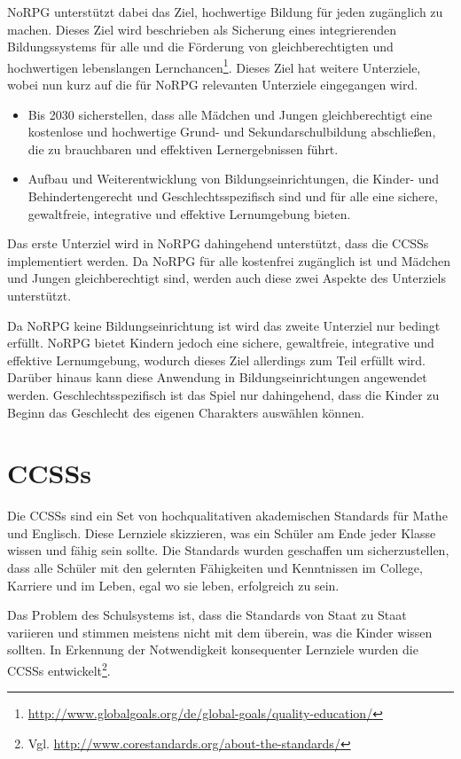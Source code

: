 NoRPG unterstützt dabei das Ziel, hochwertige Bildung für jeden zugänglich zu machen. Dieses Ziel wird beschrieben als Sicherung eines integrierenden Bildungssystems für alle und die Förderung von gleichberechtigten und hochwertigen lebenslangen Lernchancen\footnote{\url{http://www.globalgoals.org/de/global-goals/quality-education/}}. Dieses Ziel hat weitere Unterziele, wobei nun kurz auf die für NoRPG relevanten Unterziele eingegangen wird.

\begin{itemize}
\item Bis 2030 sicherstellen, dass alle Mädchen und Jungen gleichberechtigt eine kostenlose und hochwertige Grund- und Sekundarschulbildung abschließen, die zu brauchbaren und effektiven Lernergebnissen führt.

\item Aufbau und Weiterentwicklung von Bildungseinrichtungen, die Kinder- und Behindertengerecht und Geschlechtsspezifisch sind und für alle eine sichere, gewaltfreie, integrative und effektive Lernumgebung bieten.
\end{itemize}

Das erste Unterziel wird in NoRPG dahingehend unterstützt, dass die \acfp{CCSS} implementiert werden. Da NoRPG für alle kostenfrei zugänglich ist und Mädchen und Jungen gleichberechtigt sind, werden auch diese zwei Aspekte des Unterziels unterstützt. 

Da NoRPG keine Bildungseinrichtung ist wird das zweite Unterziel nur bedingt erfüllt. NoRPG bietet Kindern jedoch eine sichere, gewaltfreie, integrative und effektive Lernumgebung, wodurch dieses Ziel allerdings zum Teil erfüllt wird. Darüber hinaus kann diese Anwendung in Bildungseinrichtungen angewendet werden. Geschlechtsspezifisch ist das Spiel nur dahingehend, dass die Kinder zu Beginn das Geschlecht des eigenen Charakters auswählen können.

\section{\aclp{CCSS}}
Die \acp{CCSS} sind ein Set von hochqualitativen akademischen Standards für Mathe und Englisch. Diese Lernziele skizzieren, was ein Schüler am Ende jeder Klasse wissen und fähig sein sollte. Die Standards wurden geschaffen um sicherzustellen, dass alle Schüler mit den gelernten Fähigkeiten und Kenntnissen im College, Karriere und im Leben, egal wo sie leben, erfolgreich zu sein.

Das Problem des Schulsystems ist, dass die Standards von Staat zu Staat variieren und stimmen meistens nicht mit dem überein, was die Kinder wissen sollten. In Erkennung der Notwendigkeit konsequenter Lernziele wurden die \acp{CCSS} entwickelt\footnote{Vgl. \url{http://www.corestandards.org/about-the-standards/}}.

